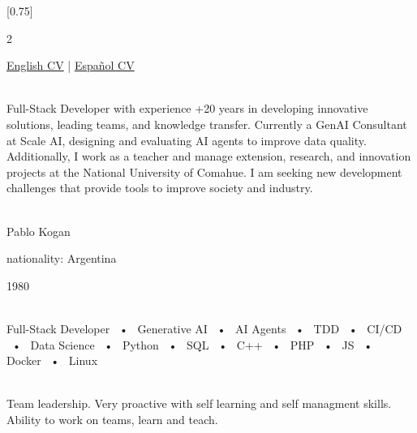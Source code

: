 \documentclass[lighthipster]{simplehipstercv}
\begin{document}
\setlength{\columnsep}{1.5cm}
[0.75]
\begin{paracol}{2}

\paracolbackgroundoptions

\footnotesize
\begin{center}
\href{https://pkogan.github.io/CV/pk202608en.pdf}{English CV}  |    
\href{https://pkogan.github.io/CV/pk202608es.pdf}{Español CV}    
\end{center}

\footnotesize
{\setasidefontcolour
\flushright
\begin{center}
\end{center}

\\[0.5em]

{\footnotesize
Full-Stack Developer with experience +20 years in developing innovative solutions, leading teams, and knowledge transfer. Currently a GenAI Consultant at Scale AI, designing and evaluating AI agents to improve data quality. Additionally, I work as a teacher and manage extension, research, and innovation projects at the National University of Comahue. I am seeking new development challenges that provide tools to improve society and industry.
}
\bigskip

 \\[0.5em]
Pablo Kogan

nationality: Argentina

1980

\bigskip

 \\[0.5em]

Full-Stack Developer ~•~ Generative AI ~•~ AI Agents ~•~ TDD ~•~ CI/CD ~•~ Data Science ~•~ Python ~•~ SQL ~•~ C++ ~•~ PHP ~•~ JS ~•~ Docker ~•~ Linux

\bigskip



\bigskip

\\[0.5em]

Team leadership.
Very proactive with self learning 
and self managment skills.
Ability to work on teams, learn and teach.
\vspace{1em}
\bigskip

}
\end{paracol}
\end{document}
